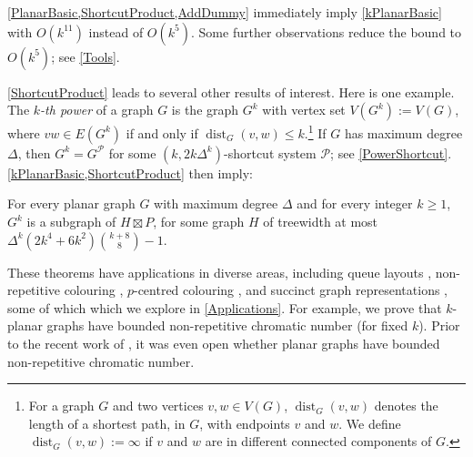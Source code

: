 \documentclass{patmorin}
\DeclareMathOperator{\dist}{dist}
\newcommand{\PP}{\mathcal{P}}
\renewcommand{\geq}{\geqslant}
\renewcommand{\leq}{\leqslant}
\begin{document}
\cref{PlanarBasic,ShortcutProduct,AddDummy} immediately imply \cref{kPlanarBasic} with $O(k^{11})$ instead of $O(k^5)$. Some further observations reduce the bound to $O(k^5)$; see \cref{Tools}. 

\cref{ShortcutProduct} leads to several other results of interest. Here is one example. The \emph{$k$-th power} of a graph $G$ is the graph $G^k$ with vertex set $V(G^k):=V(G)$, where $vw\in E(G^k)$ if and only if $\dist_G(v,w)\leq k$.\footnote{For a graph $G$ and two vertices $v,w\in V(G)$, $\dist_G(v,w)$  denotes the length of a shortest path, in $G$, with endpoints $v$ and $w$.  We define $\dist_G(v,w):=\infty$ if $v$ and $w$ are in different connected components of $G$.} If $G$ has maximum degree $\Delta$, then $G^k = G^\PP$ for some $(k,2k\Delta^{k})$-shortcut system $\PP$; see \cref{PowerShortcut}. \cref{kPlanarBasic,ShortcutProduct} then imply:

\begin{thm}
\label{kPowerBasic}
For every planar graph $G$ with maximum degree $\Delta$ and for every integer $k\geq 1$, $G^k$ is a subgraph of $H\boxtimes P$, for some graph $H$ of treewidth at most 
$\Delta^{k} (2k^4+6k^2)\binom{k+8}{8}-1$. 
\end{thm}



These theorems have applications in diverse areas, including queue layouts  \citep{dujmovic.joret.ea:planar}, non-repetitive colouring  \citep{dujmovic.esperet.ea:planar}, $p$-centred colouring  \citep{micek:personal}, and succinct graph representations \citep{bonamy.gavoille.ea:shorter}, some of which
which we explore in \cref{Applications}. For example, we prove that $k$-planar graphs have bounded non-repetitive chromatic number (for fixed $k$). Prior to the recent work of \citet{dujmovic.esperet.ea:planar}, it was even open whether planar graphs have bounded non-repetitive chromatic number.
\end{document}

